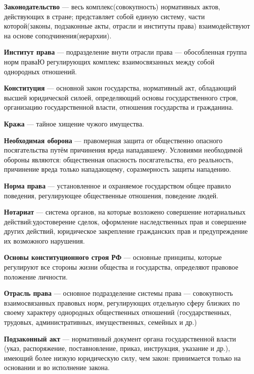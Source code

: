 \documentclass[a4paper, 12pt]{article}
\begin{document}
        \textbf{Законодательство} --- весь комплекс(совокупность) нормативных актов, действующих в стране; представляет собой единую систему, части которой(законы, подзаконные акты, отрасли и институты права) взаимодействуют на основе соподчинения(иерархии). \par
        \textbf{Институт права} --- подразделение внути отрасли права --- обособленная группа норм праваЮ регулирующих комплекс взаимосвязанных между собой однородных отношений. \par
        \textbf{Конституция} ---  основной закон государства, нормативный акт, обладающий высшей юридической силоей, определяющий основы государственного строя, организацию государственной власти, отношения государства и гражданина.\par
        \textbf{Кража} --- тайное хищение чужого имущества. \par
        \textbf{Необходимая оборона} --- правомерная защита от общественно опасного посягательства путём причинения вреда нападавшему. Условиями необходимой обороны являются: общественная опасность посягательства, его реальность, причинение вреда только нападающему, соразмерность защиты нападению. \par
        \textbf{Норма права} --- установленное и охраняемое государством общее правило поведения, регулирующее общественные отношения, поведение людей. \par
        \textbf{Нотариат} --- система органов, на которые возложено совершение нотариальных действий:удостоверение сделок, оформление наследственных прав и совершение других действий, юридическое закрепление гражданских прав и предупреждение их возможного нарушения. \par
        \textbf{Основы конституционного строя РФ} --- основные принципы, которые регулируют все стороны жизни общества и государства, определяют правовое положение личности. \par
        \textbf{Отрасль права} --- основное подразделение системы права --- совокупность взаимосвязанных  правовых норм, регулирующих отдельную сферу близких по своему характеру однородных общественных отношений (государственных, трудовых, административных, имущественных, семейных и др.) \par
        \textbf{Подзаконный акт} --- нормативный документ органа государственной власти (указ, распоряжение, поставновление, приказ, инструкция, указание и др.), имеющий более низкую юридическую силу, чем закон: принимается только на основании и во исполнение закона. \par
\end{document}
